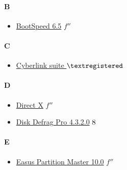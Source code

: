 	\paragraph{B} \hypertarget{UB}{}
		\begin{itemize}
			\item \href{https://mega.nz/#!PKYlHYhC!IJublTtYDIjoSA5YIdSG6QbAe4zKTr8bUQI2ddLfExE} {BootSpeed 6.5} $f''$ \\		
			
		\end{itemize}
	
	\paragraph{C} \hypertarget{UC}{}
		\begin{itemize}
			\item \href{https://mega.nz/#!ujBCUTpI!rmK212yhtWfTzw74QoJnbzJfoP8bD-lqFI3aQvFxWCI} {Cyberlink suite } $\textregistered$ \\		
			
		\end{itemize}
	
	\paragraph{D} \hypertarget{UD}{}
		\begin{itemize}
			\item \href{https://mega.nz/#!iH5yVAga!WDichU-A53dvj-zf8ewW9fTYIoK2QCQlctSRDC6TMeI} {Direct X} $f''$ \\		
			\item \href{https://mega.nz/#!bjZAwYSY!q5SSSxaMjg08jzhrce3j58ltDngzronoLXfccUfhQzw} {Disk Defrag Pro 4.3.2.0} $\oldstylenums{8}$ \\
			
		\end{itemize}
	
	\paragraph{E} \hypertarget{UE}{}
		\begin{itemize}
			\item \href{https://mega.nz/#!PLxBwJrR!e_Wfl_AlRX1PsQway24JZTkyg6hCoc0L8iv_PAl7CwI} {Easus Partition Master 10.0} $f''$ \\		
			
		\end{itemize}
	

